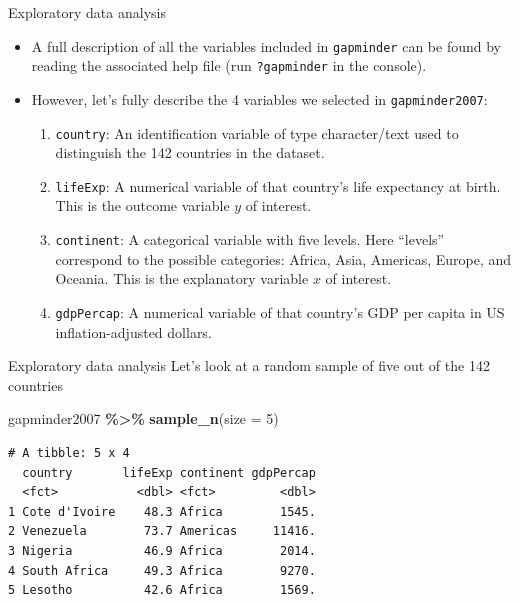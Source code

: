 \documentclass[
  ignorenonframetext,
]{beamer}
\newenvironment{Shaded}{\begin{snugshade}}{\end{snugshade}}
\newcommand{\AttributeTok}[1]{\textcolor[rgb]{0.13,0.29,0.53}{#1}}
\newcommand{\DecValTok}[1]{\textcolor[rgb]{0.00,0.00,0.81}{#1}}
\newcommand{\FunctionTok}[1]{\textcolor[rgb]{0.13,0.29,0.53}{\textbf{#1}}}
\newcommand{\NormalTok}[1]{#1}
\newcommand{\SpecialCharTok}[1]{\textcolor[rgb]{0.81,0.36,0.00}{\textbf{#1}}}
\begin{document}
\begin{frame}[fragile]{Exploratory data analysis}
\protect\hypertarget{exploratory-data-analysis-1}{}
\begin{itemize}
\item
  A full description of all the variables included in \texttt{gapminder}
  can be found by reading the associated help file (run
  \texttt{?gapminder} in the console).
\item
  However, let's fully describe the 4 variables we selected in
  \texttt{gapminder2007}:

  \begin{enumerate}
  \item
    \texttt{country}: An identification variable of type character/text
    used to distinguish the 142 countries in the dataset.
  \item
    \texttt{lifeExp}: A numerical variable of that country's life
    expectancy at birth. This is the outcome variable \(y\) of interest.
  \item
    \texttt{continent}: A categorical variable with five levels. Here
    ``levels'' correspond to the possible categories: Africa, Asia,
    Americas, Europe, and Oceania. This is the explanatory variable
    \(x\) of interest.
  \item
    \texttt{gdpPercap}: A numerical variable of that country's GDP per
    capita in US inflation-adjusted dollars.
  \end{enumerate}
\end{itemize}
\end{frame}

\begin{frame}[fragile]{Exploratory data analysis}
\protect\hypertarget{exploratory-data-analysis-2}{}
Let's look at a random sample of five out of the 142 countries

\begin{Shaded}
\begin{Highlighting}[]
\NormalTok{gapminder2007 }\SpecialCharTok{\%\textgreater{}\%} 
  \FunctionTok{sample\_n}\NormalTok{(}\AttributeTok{size =} \DecValTok{5}\NormalTok{)}
\end{Highlighting}
\end{Shaded}

\begin{verbatim}
# A tibble: 5 x 4
  country       lifeExp continent gdpPercap
  <fct>           <dbl> <fct>         <dbl>
1 Cote d'Ivoire    48.3 Africa        1545.
2 Venezuela        73.7 Americas     11416.
3 Nigeria          46.9 Africa        2014.
4 South Africa     49.3 Africa        9270.
5 Lesotho          42.6 Africa        1569.
\end{verbatim}
\end{frame}
\end{document}
